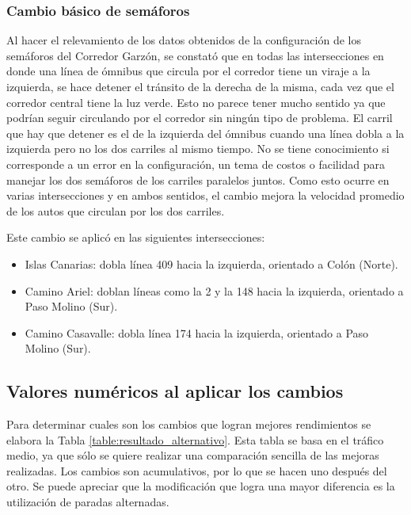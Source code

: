 \subsubsection{Cambio básico de semáforos}
Al hacer el relevamiento de los datos obtenidos de la configuración de los semáforos del Corredor Garzón, se constató que en todas las intersecciones en donde una línea de ómnibus que circula por el corredor tiene un viraje a la izquierda, se hace detener el tránsito de la derecha de la misma, cada vez que el corredor central tiene la luz verde. Esto no parece tener mucho sentido ya que podrían seguir circulando por el corredor sin ningún tipo de problema. El carril que hay que detener es el de la izquierda del ómnibus cuando una línea dobla a la izquierda pero no los dos carriles al mismo tiempo. No se tiene conocimiento si corresponde a un error en la configuración, un tema de costos o facilidad para manejar los dos semáforos de los carriles paralelos juntos. Como esto ocurre en varias intersecciones y en ambos sentidos, el cambio mejora la velocidad promedio de los autos que circulan por los dos carriles.

Este cambio se aplicó en las siguientes intersecciones:
\begin{itemize}
	\item Islas Canarias: dobla línea 409 hacia la izquierda, orientado a Colón (Norte).
	\item Camino Ariel: doblan líneas como la  2 y la 148 hacia la izquierda, orientado a Paso Molino (Sur). 
	\item Camino Casavalle: dobla línea 174 hacia la izquierda, orientado a Paso Molino (Sur). 
\end{itemize}

\subsection{Valores numéricos al aplicar los cambios}

Para determinar cuales son los cambios que logran mejores rendimientos se elabora la Tabla \ref{table:resultado_alternativo}. Esta tabla se basa en el tráfico medio, ya que sólo se quiere realizar una comparación sencilla de las mejoras realizadas. Los cambios son acumulativos, por lo que se hacen uno después del otro. Se puede apreciar que la modificación que logra una mayor diferencia es la utilización de paradas alternadas.


